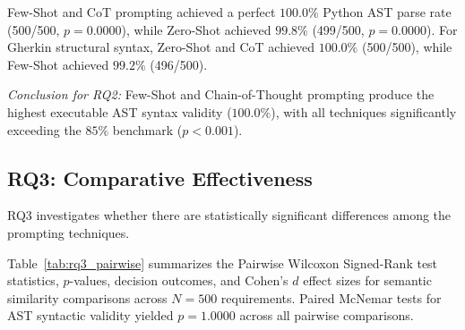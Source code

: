 \begin{table}[htbp]
\caption{Structural Content Statistics across Prompting Techniques}
\label{tab:content_stats}
\begin{center}
\end{center}
\end{table}

Few-Shot and CoT prompting achieved a perfect $100.0\%$ Python AST parse rate (500/500, $p = 0.0000$), while Zero-Shot achieved $99.8\%$ (499/500, $p = 0.0000$). For Gherkin structural syntax, Zero-Shot and CoT achieved $100.0\%$ (500/500), while Few-Shot achieved $99.2\%$ (496/500).

\textit{Conclusion for RQ2:} Few-Shot and Chain-of-Thought prompting produce the highest executable AST syntax validity ($100.0\%$), with all techniques significantly exceeding the $85\%$ benchmark ($p < 0.001$).

\subsection{RQ3: Comparative Effectiveness}
RQ3 investigates whether there are statistically significant differences among the prompting techniques.

Table~\ref{tab:rq3_pairwise} summarizes the Pairwise Wilcoxon Signed-Rank test statistics, $p$-values, decision outcomes, and Cohen's $d$ effect sizes for semantic similarity comparisons across $N=500$ requirements. Paired McNemar tests for AST syntactic validity yielded $p = 1.0000$ across all pairwise comparisons.

\begin{table}[htbp]
\caption{RQ3: Pairwise Wilcoxon Signed-Rank Test Results and Effect Sizes}
\label{tab:rq3_pairwise}
\begin{center}
\end{center}
\end{table}

